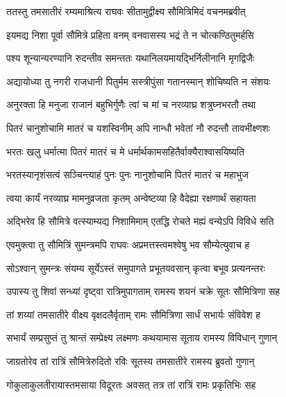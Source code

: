 
\twolineshloka
{ततस्तु तमसातीरं रम्यमाश्रित्य राघवः}
{सीतामुद्वीक्ष्य सौमित्रिमिदं वचनमब्रवीत्} %

\twolineshloka
{इयमद्य निशा पूर्वा सौमित्रे प्रहिता वनम्}
{वनवासस्य भद्रं ते न चोत्कण्ठितुमर्हसि} %

\twolineshloka
{पश्य शून्यान्यरण्यानि रुदन्तीव समन्ततः}
{यथानिलयमायद्भिर्निलीनानि मृगद्विजैः} %

\twolineshloka
{अद्यायोध्या तु नगरी राजधानी पितुर्मम}
{सस्त्रीपुंसा गतानस्मान् शोचिष्यति न संशयः} %

\twolineshloka
{अनुरक्ता हि मनुजा राजानं बहुभिर्गुणैः}
{त्वां च मां च नरव्याघ्र शत्रुघ्नभरतौ तथा} %

\twolineshloka
{पितरं चानुशोचामि मातरं च यशस्विनीम्}
{अपि नान्धौ भवेतां नौ रुदन्तौ तावभीक्ष्णशः} %

\twolineshloka
{भरतः खलु धर्मात्मा पितरं मातरं च मे}
{धर्मार्थकामसहितैर्वाक्यैराश्वासयिष्यति} %

\twolineshloka
{भरतस्यानृशंसत्वं सञ्चिन्त्याहं पुनः पुनः}
{नानुशोचामि पितरं मातरं च महाभुज} %

\twolineshloka
{त्वया कार्यं नरव्याघ्र मामनुव्रजता कृतम्}
{अन्वेष्टव्या हि वैदेह्या रक्षणार्थं सहायता} %

\twolineshloka
{अद्भिरेव हि सौमित्रे वत्स्याम्यद्य निशामिमाम्}
{एतद्धि रोचते मह्यं वन्येऽपि विविधे सति} %

\twolineshloka
{एवमुक्त्वा तु सौमित्रिं सुमन्त्रमपि राघवः}
{अप्रमत्तस्त्वमश्वेषु भव सौम्येत्युवाच ह} %

\twolineshloka
{सोऽश्वान् सुमन्त्रः संयम्य सूर्येऽस्तं समुपागते}
{प्रभूतयवसान् कृत्वा बभूव प्रत्यनन्तरः} %

\twolineshloka
{उपास्य तु शिवां सन्ध्यां दृष्ट्वा रात्रिमुपागताम्}
{रामस्य शयनं चक्रे सूतः सौमित्रिणा सह} %

\twolineshloka
{तां शय्यां तमसातीरे वीक्ष्य वृक्षदलैर्वृताम्}
{रामः सौमित्रिणा सार्धं सभार्यः संविवेश ह} %

\twolineshloka
{सभार्यं सम्प्रसुप्तं तु श्रान्तं सम्प्रेक्ष्य लक्ष्मणः}
{कथयामास सूताय रामस्य विविधान् गुणान्} %

\twolineshloka
{जाग्रतोरेव तां रात्रिं सौमित्रेरुदितो रविः}
{सूतस्य तमसातीरे रामस्य ब्रुवतो गुणान्} %

\twolineshloka
{गोकुलाकुलतीरायास्तमसाया विदूरतः}
{अवसत् तत्र तां रात्रिं रामः प्रकृतिभिः सह} %

